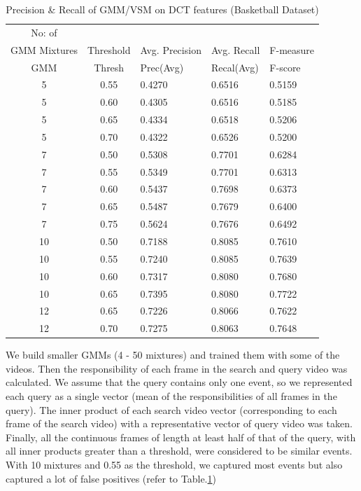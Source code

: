\begin{table}[ht]
\caption[Event spotting using GMM/VSM on DCT features (OSUPEL Basketball Dataset) ]{ Precision \& Recall  of GMM/VSM on DCT features (Basketball Dataset)}
\label{table:dct_gmm_res_basket}
\centering
\begin{tabular}{|c|c|l|l|l|}
\hline
No: of &&&&\\
GMM Mixtures & Threshold & Avg. Precision & Avg. Recall & F-measure\\
\hline
\hline
GMM	 & Thresh	 & Prec(Avg)	 & Recal(Avg)	 & F-score \\
 5	 & 0.55	 & 0.4270	 & 0.6516	 & 0.5159 \\
 5	 & 0.60	 & 0.4305	 & 0.6516	 & 0.5185 \\
 5	 & 0.65	 & 0.4334	 & 0.6518	 & 0.5206 \\
 5	 & 0.70	 & 0.4322	 & 0.6526	 & 0.5200 \\
 7	 & 0.50	 & 0.5308	 & 0.7701	 & 0.6284 \\
 7	 & 0.55	 & 0.5349	 & 0.7701	 & 0.6313 \\
 7	 & 0.60	 & 0.5437	 & 0.7698	 & 0.6373 \\
 7	 & 0.65	 & 0.5487	 & 0.7679	 & 0.6400 \\
 7	 & 0.75	 & 0.5624	 & 0.7676	 & 0.6492 \\
10	 & 0.50	 & 0.7188	 & 0.8085	 & 0.7610 \\
10	 & 0.55	 & 0.7240	 & 0.8085	 & 0.7639 \\
10	 & 0.60	 & 0.7317	 & 0.8080	 & 0.7680 \\
10	 & 0.65	 & 0.7395	 & 0.8080	 & 0.7722 \\
12	 & 0.65	 & 0.7226	 & 0.8066	 & 0.7622 \\
12	 & 0.70	 & 0.7275	 & 0.8063	 & 0.7648 \\
\hline  
\end{tabular}
\end{table}

We build smaller GMMs (4 - 50 mixtures) and trained them with some of the videos.  Then the responsibility of each frame in the search and query video was calculated.  We assume that the query contains only one event, so we represented each query as a single vector (mean of the responsibilities of all frames in the query).  The inner product of each search video vector (corresponding to each frame of the search video) with a representative vector of query video was taken.  Finally, all the continuous frames of length at least half of that of the query, with all inner products greater than a threshold, were considered to be similar events.  With 10 mixtures and 0.55 as the threshold, we captured most events but also captured a lot of false positives (refer to Table.\ref{table:dct_gmm_res_basket})


